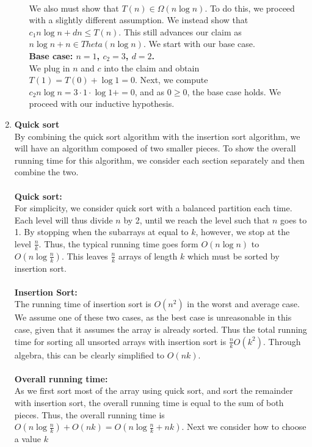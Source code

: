 \documentclass{article}
\begin{document}
\begin{enumerate}
\begin{enumerate}
\\We also must show that $T(n) \in \Omega(n\log n)$. To do this, we proceed with a slightly different assumption. We instead show that $c_1 n \log n + dn \leq T(n)$. This still advances our claim as $n \log n + n \in Theta(n \log n)$. We start with our base case.
	\\ \textbf{Base case: $n=1$, $c_2=3$, $d=2$.}
	\\ We plug in $n$ and $c$ into the claim and obtain $T(1)=T(0)+\log 1= 0$. Next, we compute $c_2 n \log n = 3 \cdot 1 \cdot \log 1 + = 0$, and as $0 \geq 0$, the base case holds. We proceed with our inductive hypothesis.

	\end{enumerate}
\item \textbf{Quick sort}
	\\ By combining the quick sort algorithm with the insertion sort algorithm, we will have an algorithm composed of two smaller pieces. To show the overall running time for this algorithm, we consider each section separately and then combine the two.
	\\ \\ \textbf{Quick sort:}
	\\ For simplicity, we consider quick sort with a balanced partition each time. Each level will thus divide $n$ by 2, until we reach the level such that $n$ goes to 1. By stopping when the subarrays at equal to $k$, however, we stop at the level $\frac{n}{k}$. Thus, the typical running time goes form $O(n\log n)$ to $O(n\log \frac{n}{k})$. This leaves $\frac{n}{k}$ arrays of length $k$ which must be sorted by insertion sort.
	\\ \\ \textbf{Insertion Sort:}
	\\ The running time of insertion sort is $O(n^2)$ in the worst and average case. We assume one of these two cases, as the best case is unreasonable in this case, given that it assumes the array is already sorted. Thus the total running time for sorting all unsorted arrays with insertion sort is $\frac{n}{k}O(k^2)$. Through algebra, this can be clearly simplified to $O(nk)$.
	\\ \\ \textbf{Overall running time:}
	\\ As we first sort most of the array using quick sort, and sort the remainder with insertion sort, the overall running time is equal to the sum of both pieces. Thus, the overall running time is $O(n\log \frac{n}{k}) + O(nk)= O(n\log \frac{n}{k} + nk)$. Next we consider how to choose a value $k$

\end{enumerate}
\end{document}
